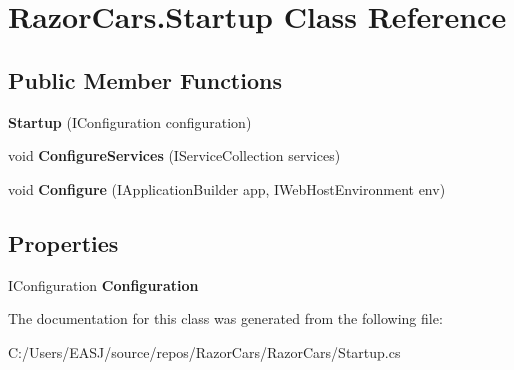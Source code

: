 \hypertarget{class_razor_cars_1_1_startup}{}\section{Razor\+Cars.\+Startup Class Reference}
\label{class_razor_cars_1_1_startup}
\subsection*{Public Member Functions}
\begin{DoxyCompactItemize}
\item 
\mbox{\label{class_razor_cars_1_1_startup_aa967831fe7b26babf1ac5b6246219ca5}} 
{\bfseries Startup} (I\+Configuration configuration)
\item 
\mbox{\label{class_razor_cars_1_1_startup_a5ff6617bc88a73083e30c9a8268045ff}} 
void {\bfseries Configure\+Services} (I\+Service\+Collection services)
\item 
\mbox{\label{class_razor_cars_1_1_startup_a764a78b3e0ee5b6f7df46ecf795e0404}} 
void {\bfseries Configure} (I\+Application\+Builder app, I\+Web\+Host\+Environment env)
\end{DoxyCompactItemize}
\subsection*{Properties}
\begin{DoxyCompactItemize}
\item 
\mbox{\label{class_razor_cars_1_1_startup_a1a7c6cfca2d7e9ecd411f9299a2f5889}} 
I\+Configuration {\bfseries Configuration}
\end{DoxyCompactItemize}


The documentation for this class was generated from the following file\+:\begin{DoxyCompactItemize}
\item 
C\+:/\+Users/\+E\+A\+S\+J/source/repos/\+Razor\+Cars/\+Razor\+Cars/Startup.\+cs\end{DoxyCompactItemize}
